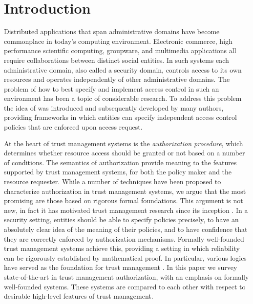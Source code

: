 \section{Introduction}
\label{section-introduction}

Distributed applications that span administrative domains have become
commonplace in today's computing environment. Electronic commerce,
high performance scientific computing, groupware, and multimedia
applications all require collaborations between distinct social
entities.  In such systems each administrative domain, also called a
security domain, controls access to its own resources and operates
independently of other administrative domains. The problem of how to
best specify and implement access control in such an environment has
been a topic of considerable research. To address this problem the
idea of  was introduced
\cite{Blaze:DTM} and subsequently developed by many authors,
providing frameworks in which entities can specify independent access
control policies that are enforced upon access request.

At the heart of trust management systems is the \emph{authorization
procedure}, which determines whether resource access should be granted
or not based on a number of conditions.  The semantics of
authorization provide meaning to the features supported by trust
management systems, for both the policy maker and the resource
requester.  While a number of techniques have been proposed to
characterize authorization in trust management systems, we argue that
the most promising are those based on rigorous formal foundations.
This argument is not new, in fact it has motivated trust management
research since its inception \cite{woo93authorizations}.  In a
security setting, entities should be able to specify policies
precisely, to have an absolutely clear idea of the meaning of their
policies, and to have confidence that they are correctly enforced by
authorization mechanisms. Formally well-founded trust management
systems achieve this, providing a setting in which reliability can be
rigorously established by mathematical proof. In particular, various
logics have served as the foundation for trust management
\cite{Abadi:LAC,Bertino:LFRAACM}. In this paper we survey
state-of-the-art in trust management authorization, with an emphasis
on formally well-founded systems.  These systems are compared to each
other with respect to desirable high-level features of trust
management.

